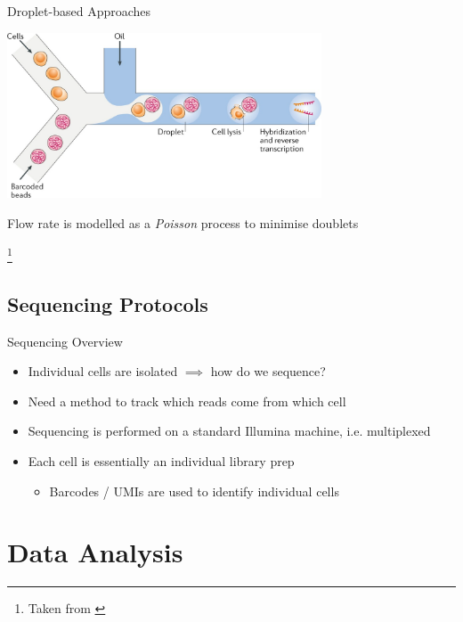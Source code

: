 \documentclass[aspectratio=169,11pt]{beamer}
\newcommand\blfootnote[1]{%
  \begingroup
  \renewcommand\thefootnote{}\footnote{#1}%
  \addtocounter{footnote}{-1}%
  \endgroup
}
\begin{document}
\begin{frame}{Droplet-based Approaches}

	\begin{center}
		\includegraphics[width=0.7\textwidth]{figures/Droplet.jpg}
	\end{center}
	
	\pause
	Flow rate is modelled as a \textit{Poisson} process to minimise doublets
	
	\blfootnote{Taken from \cite{pmid29789704}}

\end{frame}

\subsection{Sequencing Protocols}

\begin{frame}{Sequencing Overview}

	\begin{itemize}
		\item Individual cells are isolated $\implies$ how do we sequence?
		\item Need a method to track which reads come from which cell
		\item Sequencing is performed on a standard Illumina machine, i.e. multiplexed
		\item Each cell is essentially an individual library prep
		\begin{itemize}
			\item Barcodes / UMIs are used to identify individual cells
		\end{itemize}
	\end{itemize}

\end{frame}

\section{Data Analysis}
\end{document}
